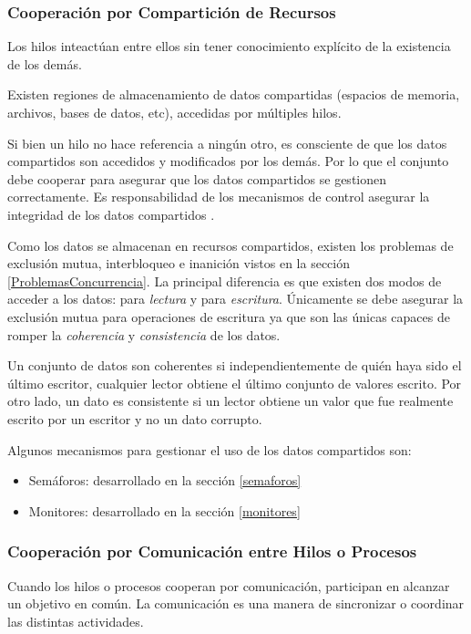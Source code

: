 \subsubsection{Cooperación por Compartición de Recursos}

Los hilos inteactúan entre ellos sin tener conocimiento explícito de la
existencia de los demás.

Existen regiones de almacenamiento de datos compartidas (espacios de memoria,
archivos, bases de datos, etc), accedidas por múltiples hilos.

Si bien un hilo no hace referencia a ningún otro, es consciente de que los
datos compartidos son accedidos y modificados por los demás. Por lo que
el conjunto debe cooperar para asegurar que los datos compartidos se gestionen
correctamente. Es responsabilidad de los mecanismos de control asegurar la
integridad de los datos compartidos \cite{SistOpStallings}.

Como los datos se almacenan en recursos compartidos, existen los problemas de
exclusión mutua, interbloqueo e inanición vistos en la sección
\ref{ProblemasConcurrencia}. La principal diferencia es que existen dos modos de
acceder a los datos: para \textit{lectura} y para \textit{escritura}. Únicamente
se debe asegurar la exclusión mutua para operaciones de escritura ya que son las
únicas capaces de romper la \textit{coherencia} y \textit{consistencia} de los
datos.

Un conjunto de datos son coherentes si independientemente de quién haya sido el
último escritor, cualquier lector obtiene el último conjunto de valores escrito.
Por otro lado, un dato es consistente si un lector obtiene un valor que fue
realmente escrito por un escritor y no un dato corrupto.

Algunos mecanismos para gestionar el uso de los datos compartidos son:
\begin{itemize}
    \item Semáforos: desarrollado en la sección \ref{semaforos}
    \item Monitores: desarrollado en la sección \ref{monitores}
\end{itemize}

\subsubsection{Cooperación por Comunicación entre Hilos o Procesos}

Cuando los hilos o procesos cooperan por comunicación, participan en alcanzar un
objetivo en común. La comunicación es una manera de sincronizar o coordinar las
distintas actividades.

